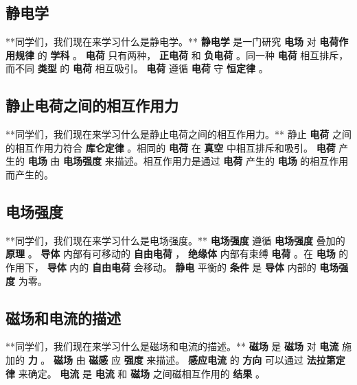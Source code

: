 \documentclass{article}%
\begin{document}
%
\begin{minipage}{0.95\textwidth}%
\subsection{静电学}%
\label{subsec:}%
**同学们，我们现在来学习什么是静电学。**\newline%
%
%
\textbf{静电学}%
是一门研究%
\textbf{电场}%
对%
\textbf{电荷作用规律}%
的%
\textbf{学科}%
。%
\textbf{电荷}%
只有两种，%
\textbf{正电荷}%
和%
\textbf{负电荷}%
。同一种%
\textbf{电荷}%
相互排斥，而不同%
\textbf{类型}%
的%
\textbf{电荷}%
相互吸引。%
\textbf{电荷}%
遵循%
\textbf{电荷}%
守%
\textbf{恒定律}%
。

%
\subsection{静止电荷之间的相互作用力}%
\label{subsec:}%
**同学们，我们现在来学习什么是静止电荷之间的相互作用力。**\newline%
%
静止%
\textbf{电荷}%
之间的相互作用力符合%
\textbf{库仑定律}%
。相同的%
\textbf{电荷}%
在%
\textbf{真空}%
中相互排斥和吸引。%
\textbf{电荷}%
产生的%
\textbf{电场}%
由%
\textbf{电场强度}%
来描述。相互作用力是通过%
\textbf{电荷}%
产生的%
\textbf{电场}%
的相互作用而产生的。

%
\subsection{电场强度}%
\label{subsec:}%
**同学们，我们现在来学习什么是电场强度。**\newline%
%
%
\textbf{电场强度}%
遵循%
\textbf{电场强度}%
叠加的%
\textbf{原理}%
。%
\textbf{导体}%
内部有可移动的%
\textbf{自由电荷}%
，%
\textbf{绝缘体}%
内部有束缚%
\textbf{电荷}%
。在%
\textbf{电场}%
的作用下，%
\textbf{导体}%
内的%
\textbf{自由电荷}%
会移动。%
\textbf{静电}%
平衡的%
\textbf{条件}%
是%
\textbf{导体}%
内部的%
\textbf{电场强度}%
为零。

%
\subsection{磁场和电流的描述}%
\label{subsec:}%
**同学们，我们现在来学习什么是磁场和电流的描述。**\newline%
%
%
\textbf{磁场}%
是%
\textbf{磁场}%
对%
\textbf{电流}%
施加的%
\textbf{力}%
。%
\textbf{磁场}%
由%
\textbf{磁感}%
应%
\textbf{强度}%
来描述。%
\textbf{感应电流}%
的%
\textbf{方向}%
可以通过%
\textbf{法拉第定律}%
来确定。%
\textbf{电流}%
是%
\textbf{电流}%
和%
\textbf{磁场}%
之间磁相互作用的%
\textbf{结果}%
。


\end{minipage}
\end{document}
